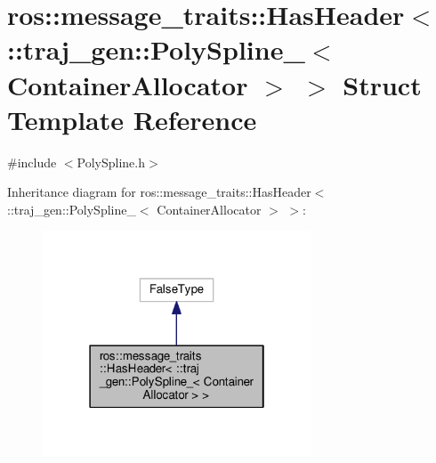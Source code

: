 \hypertarget{structros_1_1message__traits_1_1_has_header_3_01_1_1traj__gen_1_1_poly_spline___3_01_container_allocator_01_4_01_4}{}\section{ros\+:\+:message\+\_\+traits\+:\+:Has\+Header$<$ \+:\+:traj\+\_\+gen\+:\+:Poly\+Spline\+\_\+$<$ Container\+Allocator $>$ $>$ Struct Template Reference}
\label{structros_1_1message__traits_1_1_has_header_3_01_1_1traj__gen_1_1_poly_spline___3_01_container_allocator_01_4_01_4}


{\ttfamily \#include $<$Poly\+Spline.\+h$>$}



Inheritance diagram for ros\+:\+:message\+\_\+traits\+:\+:Has\+Header$<$ \+:\+:traj\+\_\+gen\+:\+:Poly\+Spline\+\_\+$<$ Container\+Allocator $>$ $>$\+:
\nopagebreak
\begin{figure}[H]
\begin{center}
\leavevmode
\includegraphics[width=226pt]{structros_1_1message__traits_1_1_has_header_3_01_1_1traj__gen_1_1_poly_spline___3_01_container_a0bd37295ce78e1f450c5afa4055212af}
\end{center}
\end{figure}


